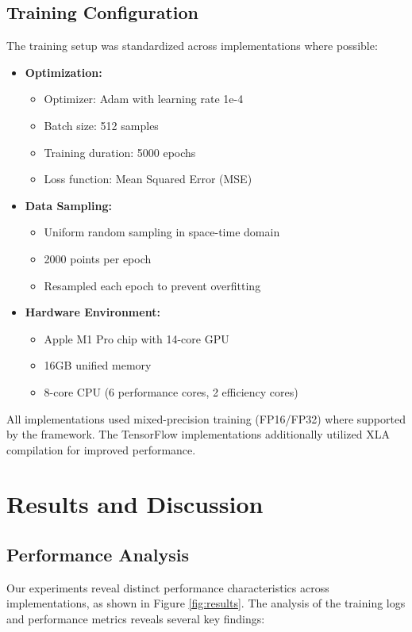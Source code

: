 \documentclass[10pt,journal,compsoc,onecolumn]{IEEEtran}
\begin{document}
\subsection{Training Configuration}
The training setup was standardized across implementations where possible:

\begin{itemize}
    \item \textbf{Optimization:}
    \begin{itemize}
        \item Optimizer: Adam with learning rate 1e-4
        \item Batch size: 512 samples
        \item Training duration: 5000 epochs
        \item Loss function: Mean Squared Error (MSE)
    \end{itemize}

    \item \textbf{Data Sampling:}
    \begin{itemize}
        \item Uniform random sampling in space-time domain
        \item 2000 points per epoch
        \item Resampled each epoch to prevent overfitting
    \end{itemize}

    \item \textbf{Hardware Environment:}
    \begin{itemize}
        \item Apple M1 Pro chip with 14-core GPU
        \item 16GB unified memory
        \item 8-core CPU (6 performance cores, 2 efficiency cores)
    \end{itemize}
\end{itemize}

All implementations used mixed-precision training (FP16/FP32) where supported by the framework. The TensorFlow implementations additionally utilized XLA compilation for improved performance.

\section{Results and Discussion}
\subsection{Performance Analysis}
Our experiments reveal distinct performance characteristics across implementations, as shown in Figure \ref{fig:results}. The analysis of the training logs and performance metrics reveals several key findings:
\end{document}
